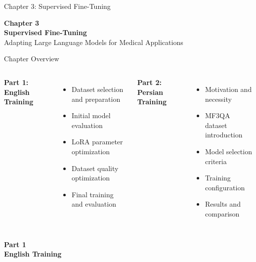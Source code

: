 
\begin{frame}{Chapter 3: Supervised Fine-Tuning}
    \begin{center}
        \Large{\textbf{Chapter 3}}\\
        \vspace{0.5em}
        \huge{\textbf{Supervised Fine-Tuning}}\\
        \vspace{0.5em}
        \large{Adapting Large Language Models for Medical Applications}
    \end{center}
\end{frame}

\begin{frame}{Chapter Overview}
    \begin{columns}[T]
        \textbf{Part 1: English Training}
        \begin{itemize}
            \item Dataset selection and preparation
            \item Initial model evaluation
            \item LoRA parameter optimization
            \item Dataset quality optimization
            \item Final training and evaluation
        \end{itemize}
        
        \textbf{Part 2: Persian Training}
        \begin{itemize}
            \item Motivation and necessity
            \item MF3QA dataset introduction
            \item Model selection criteria
            \item Training configuration
            \item Results and comparison
        \end{itemize}
    \end{columns}
\end{frame}

\begin{frame}[plain]
    \begin{center}
        \Large{\textbf{Part 1}}\\
        \vspace{0.5em}
        \huge{\textbf{English Training}}\\
    \end{center}
\end{frame}

